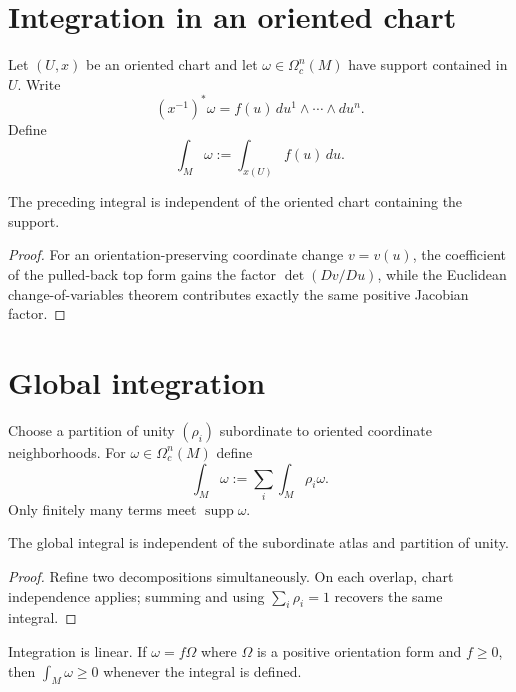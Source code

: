 \section{Integration in an oriented chart}
\begin{definition}\label{def:vii10-chart-integral}
Let $(U,x)$ be an oriented chart and let $\omega\in\Omega_c^n(M)$ have support contained in $U$. Write
\[
(x^{-1})^*\omega=f(u)\,du^1\wedge\cdots\wedge du^n.
\]
Define
\[
\int_M\omega:=\int_{x(U)}f(u)\,du.
\]
\end{definition}

\begin{theorem}\label{thm:vii10-chart-independent}
The preceding integral is independent of the oriented chart containing the support.
\end{theorem}
\begin{proof}
For an orientation-preserving coordinate change $v=v(u)$, the coefficient of the pulled-back top form gains the factor $\det(Dv/Du)$, while the Euclidean change-of-variables theorem contributes exactly the same positive Jacobian factor.
\end{proof}

\section{Global integration}
\begin{definition}\label{def:vii10-global-integral}
Choose a partition of unity $(\rho_i)$ subordinate to oriented coordinate neighborhoods. For $\omega\in\Omega_c^n(M)$ define
\[
\int_M\omega:=\sum_i\int_M\rho_i\omega.
\]
Only finitely many terms meet $\operatorname{supp}\omega$.
\end{definition}

\begin{theorem}\label{thm:vii10-well-defined}
The global integral is independent of the subordinate atlas and partition of unity.
\end{theorem}
\begin{proof}
Refine two decompositions simultaneously. On each overlap, chart independence applies; summing and using $\sum_i\rho_i=1$ recovers the same integral.
\end{proof}

\begin{proposition}\label{prop:vii10-linearity}
Integration is linear. If $\omega=f\Omega$ where $\Omega$ is a positive orientation form and $f\ge0$, then $\int_M\omega\ge0$ whenever the integral is defined.
\end{proposition}

